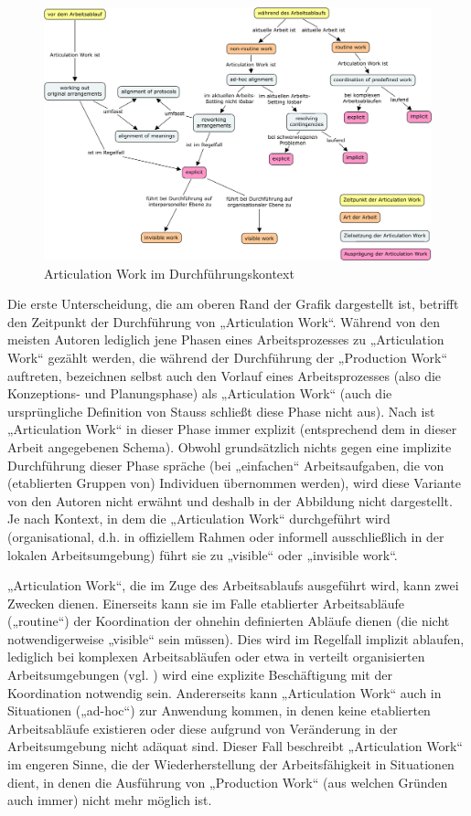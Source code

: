 \begin{figure}[htbp]
	\centering
		\includegraphics[width=\textwidth]{img/ArticulationWork/aw_conceptual_structure.png}
	\caption{Articulation Work im Durchführungskontext}
	\label{fig:img_ArticulationWork_aw_conceptual_structure}
\end{figure}

Die erste Unterscheidung, die am oberen Rand der Grafik dargestellt ist, betrifft den Zeitpunkt der Durchführung von „Articulation Work“. Während von den meisten Autoren lediglich jene Phasen eines Arbeitsprozesses zu „Articulation Work“ gezählt werden, die während der Durchführung der „Production Work“ auftreten, bezeichnen \citet{Corbin93} selbst auch den Vorlauf eines Arbeitsprozesses (also die Konzeptions- und Planungsphase) als „Articulation Work“ (auch die ursprüngliche Definition von Stauss schließt diese Phase nicht aus). Nach \citet{Corbin93} ist „Articulation Work“ in dieser Phase immer explizit (entsprechend dem in dieser Arbeit angegebenen Schema). Obwohl grundsätzlich nichts gegen eine implizite Durchführung dieser Phase spräche (bei „einfachen“ Arbeitsaufgaben, die von (etablierten Gruppen von) Individuen übernommen werden), wird diese Variante von den Autoren nicht erwähnt und deshalb in der Abbildung nicht dargestellt. Je nach Kontext, in dem die „Articulation Work“ durchgeführt wird (organisational, d.h. in offiziellem Rahmen oder informell ausschließlich in der lokalen Arbeitsumgebung) führt sie zu „visible“ oder „invisible work“.

„Articulation Work“, die im Zuge des Arbeitsablaufs ausgeführt wird, kann zwei Zwecken dienen. Einerseits kann sie im Falle etablierter Arbeitsabläufe („routine“) der Koordination der ohnehin definierten Abläufe dienen (die nicht notwendigerweise „visible“ sein müssen). Dies wird im Regelfall implizit ablaufen, lediglich bei komplexen Arbeitsabläufen oder etwa in verteilt organisierten Arbeitsumgebungen (vgl. \citep{Carstensen99}) wird eine explizite Beschäftigung mit der Koordination notwendig sein. Andererseits kann „Articulation Work“ auch in Situationen („ad-hoc“) zur Anwendung kommen, in denen keine etablierten Arbeitsabläufe existieren oder diese aufgrund von Veränderung in der Arbeitsumgebung nicht adäquat sind. Dieser Fall beschreibt „Articulation Work“ im engeren Sinne, die der Wiederherstellung der Arbeitsfähigkeit in Situationen dient, in denen die Ausführung von „Production Work“ (aus welchen Gründen auch immer) nicht mehr möglich ist.

